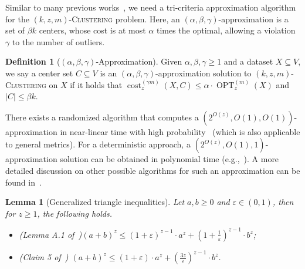 \documentclass[letterpaper,11pt]{article}
\theoremstyle{plain}
\newtheorem{lemma}[theorem]{Lemma}
\theoremstyle{definition}
\newtheorem{definition}[theorem]{Definition}
\theoremstyle{remark}
\DeclareMathOperator{\cost}{cost}
\DeclareMathOperator{\OPT}{OPT}
\renewcommand{\epsilon}{\varepsilon}
\newcommand{\ProblemName}[1]{\textsc{#1}}
\newcommand{\kzmC}{\ProblemName{$(k,z,m)$-Clustering}\xspace}
\begin{document}
Similar to many previous works~\cite{Braverman22Power,Huang2022Near-optimal,Huang2023General}, we need a tri-criteria approximation algorithm for the \kzmC problem.
Here, an $(\alpha, \beta, \gamma)$-approximation is a set of $\beta k$ centers, whose cost is at most $\alpha$ times the optimal, allowing a violation $\gamma$ to the number of outliers.
\begin{definition}[$(\alpha,\beta,\gamma)$-Approximation]
    \label{def:tri_criteria}
    Given $\alpha,\beta,\gamma \ge 1$ and a dataset $X\subseteq V$, we say a center set $C\subseteq  V$ is an $(\alpha,\beta,\gamma)$-approximation solution to \kzmC on $X$ if it holds that $\cost_z^{(\gamma m)}(X,C)\le \alpha\cdot\OPT_z^{(m)}(X)$ and $|C|\le \beta k$.
\end{definition}
There exists a randomized algorithm that computes a $(2^{O(z)}, O(1), O(1))$-approximation in near-linear time with high probability~\cite{Bhaskara19Greedy} (which is also applicable to general metrics). For a deterministic approach,
a $(2^{O(z)}, O(1), 1)$-approximation solution can be obtained in polynomial time (e.g.,~\cite{DBLP:journals/talg/FriggstadKRS19}).
A more detailed discussion on other possible algorithms for such an approximation can be found in~\cite[Appendix A]{Huang2022Near-optimal}. 


\begin{lemma}[Generalized triangle inequalities]
    \label{lem:triangle}
    Let $a,b\ge 0$ and $\epsilon\in (0,1)$, then for $z\ge 1$, the following holds.
    \begin{itemize}
        \item [1.] (Lemma A.1 of~\cite{Makarychev19Performance})$(a+b)^z\le (1+\epsilon)^{z-1}\cdot a^z + (1+\frac{1}{\epsilon})^{z-1}\cdot b^z$;
        \item [2.] (Claim 5 of~\cite{Sohler18Strong}) $(a+b)^z\le (1+\epsilon)\cdot a^z + (\frac{3z}{\epsilon})^{z-1}\cdot b^z$.
    \end{itemize}
\end{lemma}
\end{document}
